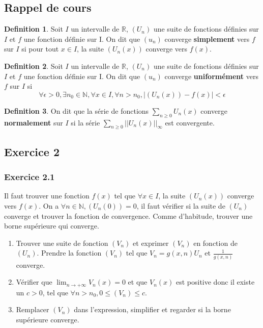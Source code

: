 \documentclass[]{book}
\theoremstyle{definition}
\newtheorem{defn}{Definition}
\newcommand{\bb}[1]{\mathbb{#1}}
\newcommand{\R}{\bb{R}}
\newcommand{\N}{\bb{N}}
\begin{document}
\subsection*{Rappel de cours}
\begin{defn}
Soit $I$ un intervalle de $\R$,  $(U_n)$ une suite de fonctions d\'efinies sur $I$ et $f$ une fonction d\'efinie sur I.
On dit que $(u_n)$ converge \textbf{simplement} vers $f$ sur $I$ si pour tout $x \in I$, la suite $(U_n(x))$ converge vers $f(x)$.
\end{defn}

\begin{defn}
Soit $I$ un intervalle de $\R$,  $(U_n)$ une suite de fonctions d\'efinies sur $I$ et $f$ une fonction d\'efinie sur I.
On dit que $(u_n)$ converge \textbf{uniform\'ement} vers $f$ sur $I$ si
$$\forall \epsilon > 0, \exists n_0 \in \N, \forall x \in I, \forall n > n_0, |(U_n(x)) - f(x)| < \epsilon$$
\end{defn}

\begin{defn}
On dit que la s\'erie de fonctions $\sum_{n\geq0}U_n(x)$ converge \textbf{normalement} sur  $I$ si la s\'erie $\sum_{n\geq0}||U_n(x)||_{\infty}$ est convergente.
 \end{defn}


\newpage
\subsection*{Exercice 2}
\subsubsection*{Exercice 2.1}
Il faut trouver une fonction $f(x)$ tel que $\forall x \in I$, la suite $(U_n(x))$ converge vers $f(x)$. On a $\forall n \in \N, (U_n(0)) = 0$, il faut v\'erifier si la suite de $(U_n)$ converge et trouver la fonction de convergence. Comme d'habitude, trouver une borne sup\'erieure qui converge. 
\begin{enumerate}
\item Trouver une suite de fonction $(V_n)$ et exprimer $(V_n)$ en fonction de $(U_n)$. Prendre la fonction $(V_n)$ tel que $V_n = g(x,n)U_n$ et $\frac{1}{g(x,n)}$ converge.
\item V\'erifier que $\lim_{n \to +\infty} V_n(x) = 0$ et que $V_n(x)$ est positive donc il existe un $c > 0$, tel que $\forall n>n_0, 0 \leq (V_n) \leq c$.
\item Remplacer $(V_n)$ dans l'expression, simplifier et regarder si la borne sup\'erieure converge.
\end{enumerate}
\end{document}
